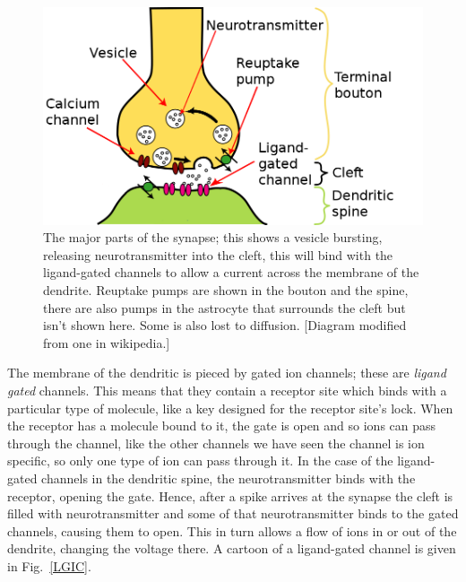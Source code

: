 \documentclass{article}
\begin{document}
\begin{figure}
\begin{center}
\includegraphics[width=12cm]{Synapse.png}
\end{center}
\caption{The major parts of the synapse; this shows a vesicle
  bursting, releasing neurotransmitter into the cleft, this will bind
  with the ligand-gated channels to allow a current across the
  membrane of the dendrite. Reuptake pumps are shown in the bouton and
  the spine, there are also pumps in the astrocyte that surrounds the
  cleft but isn't shown here. Some is also lost to diffusion. [Diagram
    modified from one in wikipedia.]}
\end{figure}

The membrane of the dendritic is pieced by gated ion channels; these
are \textsl{ligand gated} channels. This means that they contain a
receptor site which binds with a particular type of molecule, like a
key designed for the receptor site's lock. When the receptor has a
molecule bound to it, the gate is open and so ions can pass through
the channel, like the other channels we have seen the channel is ion
specific, so only one type of ion can pass through it. In the case of
the ligand-gated channels in the dendritic spine, the neurotransmitter
binds with the receptor, opening the gate. Hence, after a spike
arrives at the synapse the cleft is filled with neurotransmitter and
some of that neurotransmitter binds to the gated channels, causing
them to open. This in turn allows a flow of ions in or out of the
dendrite, changing the voltage there. A cartoon of a ligand-gated
channel is given in Fig.~\ref{LGIC}.
\end{document}
